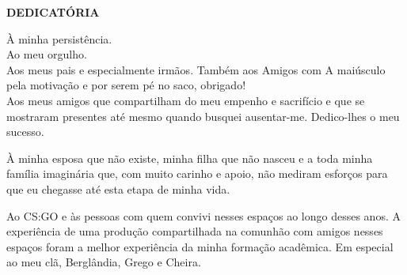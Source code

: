 \vfill
\begin{center}
{\textbf{DEDICATÓRIA}\\}
\end{center}

\noindent À minha persistência.\\
\noindent Ao meu orgulho.\\
\noindent Aos meus pais e especialmente irmãos. Também aos Amigos com A maiúsculo pela motivação e por serem pé no saco, obrigado!\\

Aos meus amigos que compartilham do meu empenho e sacrifício e que se mostraram presentes até mesmo quando busquei ausentar-me. Dedico-lhes o meu sucesso.

À minha esposa que não existe, minha filha que não nasceu e a toda minha família imaginária que, com muito carinho e apoio, não mediram esforços para que eu chegasse até esta etapa de minha vida.

Ao CS:GO e às pessoas com quem convivi nesses espaços ao longo desses anos. A experiência de uma produção compartilhada na comunhão com amigos nesses espaços foram a melhor experiência da minha formação acadêmica. Em especial ao meu clã, Berglândia, Grego e Cheira.\\